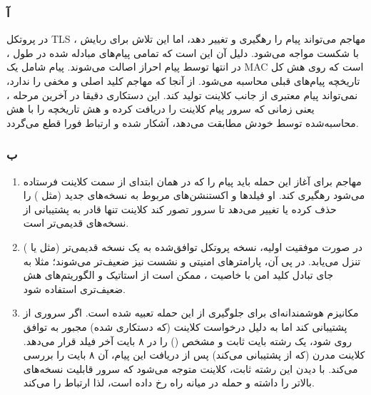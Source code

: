 
\subsubsection*{آ}
در پروتکل TLS ، مهاجم می‌تواند پیام  را رهگیری و تغییر دهد، اما این تلاش برای ربایش با شکست مواجه می‌شود. دلیل آن این است که تمامی پیام‌های مبادله شده در طول  ، در انتها توسط پیام  احراز اصالت می‌شوند. پیام  شامل یک MAC است که روی هش کل تاریخچه پیام‌های قبلی محاسبه می‌شود. از آنجا که مهاجم کلید اصلی و مخفی را ندارد، نمی‌تواند پیام  معتبری از جانب کلاینت تولید کند.
این دستکاری دقیقا در {آخرین مرحله } ، یعنی زمانی که سرور پیام  کلاینت را دریافت کرده و هش تاریخچه را با هش محاسبه‌شده توسط خودش مطابقت می‌دهد، آشکار شده و ارتباط فورا قطع می‌گردد.

\subsubsection*{ب}
\begin{enumerate}
    \item  مهاجم برای آغاز این حمله باید پیام  را که در همان ابتدای  از سمت کلاینت فرستاده می‌شود رهگیری کند. او فیلدها و اکستنشن‌های مربوط به نسخه‌های جدید (مثل ) را حذف کرده یا تغییر می‌دهد تا سرور تصور کند کلاینت تنها قادر به پشتیبانی از نسخه‌های قدیمی‌تر است.
    \item  در صورت موفقیت اولیه، نسخه پروتکل توافق‌شده به یک نسخه قدیمی‌تر (مثل  یا ) تنزل می‌یابد. در پی آن، پارامترهای امنیتی و  نشست نیز ضعیف‌تر می‌شوند؛ مثلا به جای تبادل کلید امن با خاصیت  ، ممکن است از  استاتیک و الگوریتم‌های هش ضعیف‌تری استفاده شود.
    \item  مکانیزم هوشمندانه‌ای برای جلوگیری از این حمله تعبیه شده است. اگر سروری از  پشتیبانی کند اما به دلیل درخواست کلاینت (که دستکاری شده) مجبور به توافق روی  شود، یک رشته بایت ثابت و مشخص () را در ۸ بایت آخر فیلد  قرار می‌دهد. کلاینت مدرن (که از  پشتیبانی می‌کند) پس از دریافت این پیام، آن ۸ بایت را بررسی می‌کند. با دیدن این رشته ثابت، کلاینت متوجه می‌شود که سرور قابلیت نسخه‌های بالاتر را داشته و حمله  در میانه راه رخ داده است، لذا ارتباط را  می‌کند.
\end{enumerate}

